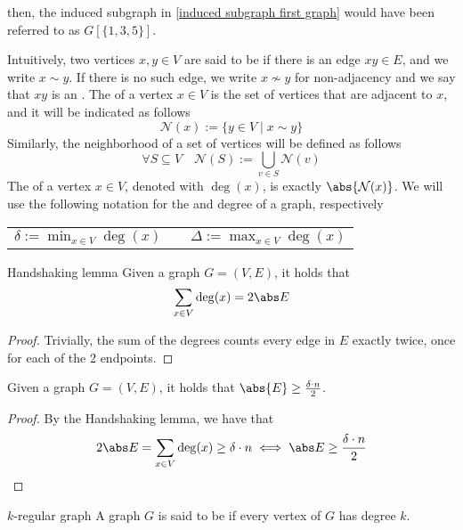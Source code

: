 \documentclass[a4paper, 12pt]{report}
\begin{document}
    then, the induced subgraph in \cref{induced subgraph first graph} would have been referred to as $G[\{1, 3, 5\}]$.

    Intuitively, two vertices $x, y \in V$ are said to be  if there is an edge $xy \in E$, and we write $x \sim y$. If there is no such edge, we write $x \nsim y$ for non-adjacency and we say that $xy$ is an . The  of a vertex $x \in V$ is the set of vertices that are adjacent to $x$, and it will be indicated as follows $$\mathcal N (x) := \{y \in V \mid x \sim y\}$$ Similarly, the neighborhood of a set of vertices will be defined as follows $$\forall S \subseteq V \quad \mathcal N(S) := \bigcup_{v \in S}{\mathcal N (v)}$$ The  of a vertex $x \in V$, denoted with $\deg(x)$, is exactly $\abs{\mathcal N (x)}$. We will use the following notation for the  and  degree of a graph, respectively

    \begin{center}
        \begin{tabular}{ccc}
            $\displaystyle \delta := \min_{x \in V}{\deg(x)}$ & \qquad & $\displaystyle \Delta := \max_{x \in V}{\deg(x)}$
        \end{tabular}
    \end{center}

    \begin{framedlem}{Handshaking lemma}
        Given a graph $G = (V, E)$, it holds that $$\sum_{x \in V}{\deg(x)} = 2 \abs E$$
    \end{framedlem}

    \begin{proof}
        Trivially, the sum of the degrees counts every edge in $E$ exactly twice, once for each of the 2 endpoints.
    \end{proof}

    \begin{framedcor}[label={cor handshaking}]{}
        Given a graph $G = (V, E)$, it holds that $\abs{E} \ge \tfrac{\delta \cdot n}{2}$.
    \end{framedcor}

    \begin{proof}
        By the Handshaking lemma, we have that $$2 \abs E = \sum_{x \in V}{\deg(x)} \ge \delta \cdot n \iff \abs E \ge \dfrac{\delta \cdot n}{2}$$
    \end{proof}

    \begin{frameddefn}{$k$-regular graph}
        A graph $G$ is said to be  if every vertex of $G$ has degree $k$.
    \end{frameddefn}
\end{document}
